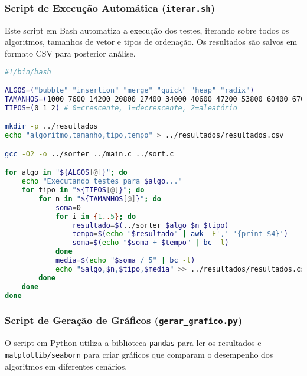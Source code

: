 \subsubsection{Script de Execução Automática (\texttt{iterar.sh})}

Este script em Bash automatiza a execução dos testes, iterando sobre todos os algoritmos, tamanhos de vetor e tipos de ordenação. Os resultados são salvos em formato CSV para posterior análise.

\begin{lstlisting}[language=bash, caption={Script para automação dos testes}, label={lst:script}]
#!/bin/bash

ALGOS=("bubble" "insertion" "merge" "quick" "heap" "radix")
TAMANHOS=(1000 7600 14200 20800 27400 34000 40600 47200 53800 60400 67000 73600 80200 86800 93400 100000)
TIPOS=(0 1 2) # 0=crescente, 1=decrescente, 2=aleatório

mkdir -p ../resultados
echo "algoritmo,tamanho,tipo,tempo" > ../resultados/resultados.csv

gcc -O2 -o ../sorter ../main.c ../sort.c

for algo in "${ALGOS[@]}"; do
    echo "Executando testes para $algo..."
    for tipo in "${TIPOS[@]}"; do
        for n in "${TAMANHOS[@]}"; do
            soma=0
            for i in {1..5}; do
                resultado=$(../sorter $algo $n $tipo)
                tempo=$(echo "$resultado" | awk -F',' '{print $4}')
                soma=$(echo "$soma + $tempo" | bc -l)
            done
            media=$(echo "$soma / 5" | bc -l)
            echo "$algo,$n,$tipo,$media" >> ../resultados/resultados.csv
        done
    done
done    
\end{lstlisting}

\subsubsection{Script de Geração de Gráficos (\texttt{gerar\_grafico.py})}

O script em Python utiliza a biblioteca \texttt{pandas} para ler os resultados e \texttt{matplotlib/seaborn} para criar gráficos que comparam o desempenho dos algoritmos em diferentes cenários.

